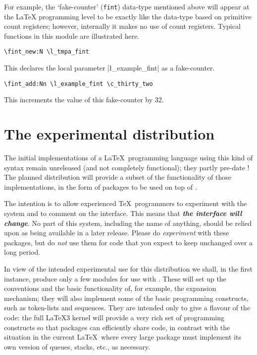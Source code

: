 \documentclass{article}
\begin{document}
For example, the `fake-counter' (\texttt{fint}) data-type mentioned
above will appear at the \LaTeX{} programming level to be exactly like
the data-type based on primitive count registers; however, internally
it makes no use of count registers.  Typical functions in this module
are illustrated here.

\pagebreak

\begin{verbatim}
\fint_new:N \l_tmpa_fint
\end{verbatim}
This declares the local parameter |\l_example_fint| as a fake-counter.

\begin{verbatim}
\fint_add:Nn \l_example_fint \c_thirty_two
\end{verbatim}
This increments the value of this fake-counter by 32.  


\section{The experimental distribution}
\label{sec:dist}

The initial implementations of a \LaTeX\ programming language using
this kind of syntax remain unreleased (and not completely functional);
they partly pre-date \LaTeXe!  The planned distribution will provide a
subset of the functionality of those implementations, in the form of
packages to be used on top of \LaTeXe.

The intention is to allow experienced \TeX\ programmers to experiment
with the system and to comment on the interface. This means that
\textbf{\itshape the interface will change}. No part of this system,
including the name of anything, should be relied upon as being
available in a later release.  Please do \emph{experiment} with these
packages, but do \emph{not} use them for code that you expect to keep
unchanged over a long period.

In view of the intended experimental use for this distribution we
shall, in the first instance, produce only a few modules for use with
\LaTeXe.  These will set up the conventions and the basic functionality
of, for example, the expansion mechanism; they will also implement some
of the basic programming constructs, such as token-lists and sequences.
They are intended only to give a flavour of the code: the full \LaTeX3
kernel will provide a very rich set of programming constructs so that
packages can efficiently share code, in contrast with the situation in
the current \LaTeX\ where every large package must implement its own
version of queues, stacks, etc., as necessary.
\end{document}
